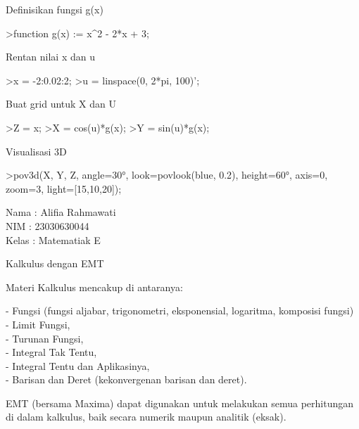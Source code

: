 \documentclass[a4paper,10pt]{article}
\begin{document}
\begin{eulernotebook}
\begin{eulercomment}
\begin{eulercomment}
\begin{eulercomment}
\begin{eulercomment}
\begin{eulercomment}
\begin{eulercomment}
\begin{eulercomment}
\begin{eulercomment}
\begin{eulercomment}
\begin{eulercomment}
\begin{eulercomment}
\begin{eulercomment}
\begin{eulercomment}
\begin{eulercomment}
\begin{eulercomment}
\begin{eulercomment}
\begin{eulercomment}
\begin{eulercomment}
\begin{eulercomment}
Definisikan fungsi g(x)
\end{eulercomment}
\begin{eulerprompt}
>function g(x) := x^2 - 2*x + 3;
\end{eulerprompt}
\begin{eulercomment}
Rentan nilai x dan u
\end{eulercomment}
\begin{eulerprompt}
>x = -2:0.02:2;
>u = linspace(0, 2*pi, 100)';
\end{eulerprompt}
\begin{eulercomment}
Buat grid untuk X dan U
\end{eulercomment}
\begin{eulerprompt}
>Z = x;
>X = cos(u)*g(x);
>Y = sin(u)*g(x);
\end{eulerprompt}
\begin{eulercomment}
Visualisasi 3D
\end{eulercomment}
\begin{eulerprompt}
>pov3d(X, Y, Z, angle=30°, look=povlook(blue, 0.2), height=60°, axis=0, zoom=3, light=[15,10,20]);
\end{eulerprompt}
\begin{euleroutput}
  
\end{euleroutput}
\begin{eulercomment}
Nama  : Alifia Rahmawati\\
NIM   : 23030630044\\
Kelas : Matematiak E

\end{eulercomment}
\eulersubheading{}
\begin{eulercomment}
Kalkulus dengan EMT

Materi Kalkulus mencakup di antaranya:

- Fungsi (fungsi aljabar, trigonometri, eksponensial, logaritma,
komposisi fungsi)\\
- Limit Fungsi,\\
- Turunan Fungsi,\\
- Integral Tak Tentu,\\
- Integral Tentu dan Aplikasinya,\\
- Barisan dan Deret (kekonvergenan barisan dan deret).

EMT (bersama Maxima) dapat digunakan untuk melakukan semua perhitungan
di dalam kalkulus, baik secara numerik maupun analitik (eksak).


\end{eulercomment}
\end{eulercomment}
\end{eulercomment}
\end{eulercomment}
\end{eulercomment}
\end{eulercomment}
\end{eulercomment}
\end{eulercomment}
\end{eulercomment}
\end{eulercomment}
\end{eulercomment}
\end{eulercomment}
\end{eulercomment}
\end{eulercomment}
\end{eulercomment}
\end{eulercomment}
\end{eulercomment}
\end{eulercomment}
\end{eulercomment}
\end{eulernotebook}
\end{document}
